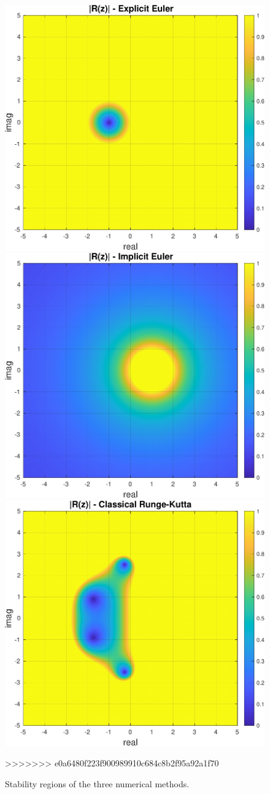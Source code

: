 \begin{figure}[htp]
\centering
\includegraphics[width=.3\textwidth]{plots/1_6b.pdf}\hfill
\includegraphics[width=.3\textwidth]{plots/1_6c.pdf}\hfill
\includegraphics[width=.3\textwidth]{plots/1_6a.pdf}
\caption{Stability regions of the three numerical methods.}
\label{fig:figure3}
>>>>>>> e0a6480f223f900989910c684c8b2f95a92a1f70

\end{figure}
